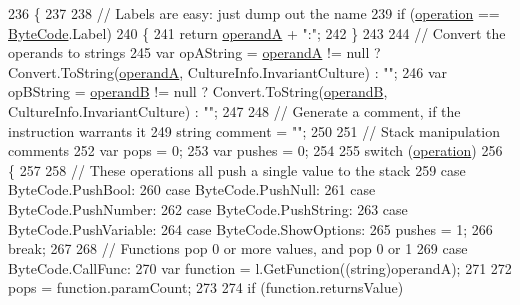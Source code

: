 \begin{DoxyCode}
236         \{
237 
238             \textcolor{comment}{// Labels are easy: just dump out the name}
239             \textcolor{keywordflow}{if} (\hyperlink{a00115_a566bf5f7198cc353ea5c3710cb3a31cb}{operation} == \hyperlink{a00050_ad5dfb6ee68ca7469623ad3e459f98894}{ByteCode}.Label)
240             \{
241                 \textcolor{keywordflow}{return} \hyperlink{a00115_ab5d386faa0d3dbc23db80f8e62706afd}{operandA} + \textcolor{stringliteral}{":"};
242             \}
243 
244             \textcolor{comment}{// Convert the operands to strings}
245             var opAString = \hyperlink{a00115_ab5d386faa0d3dbc23db80f8e62706afd}{operandA} != null ? Convert.ToString(\hyperlink{a00115_ab5d386faa0d3dbc23db80f8e62706afd}{operandA}, 
      CultureInfo.InvariantCulture) : \textcolor{stringliteral}{""};
246             var opBString = \hyperlink{a00115_a56348c6fe7eb919b7277afc06e5b224a}{operandB} != null ? Convert.ToString(\hyperlink{a00115_a56348c6fe7eb919b7277afc06e5b224a}{operandB}, 
      CultureInfo.InvariantCulture) : \textcolor{stringliteral}{""};
247 
248             \textcolor{comment}{// Generate a comment, if the instruction warrants it}
249             \textcolor{keywordtype}{string} comment = \textcolor{stringliteral}{""};
250 
251             \textcolor{comment}{// Stack manipulation comments}
252             var pops = 0;
253             var pushes = 0;
254 
255             \textcolor{keywordflow}{switch} (\hyperlink{a00115_a566bf5f7198cc353ea5c3710cb3a31cb}{operation})
256             \{
257 
258                 \textcolor{comment}{// These operations all push a single value to the stack}
259                 \textcolor{keywordflow}{case} ByteCode.PushBool:
260                 \textcolor{keywordflow}{case} ByteCode.PushNull:
261                 \textcolor{keywordflow}{case} ByteCode.PushNumber:
262                 \textcolor{keywordflow}{case} ByteCode.PushString:
263                 \textcolor{keywordflow}{case} ByteCode.PushVariable:
264                 \textcolor{keywordflow}{case} ByteCode.ShowOptions:
265                     pushes = 1;
266                     \textcolor{keywordflow}{break};
267 
268                 \textcolor{comment}{// Functions pop 0 or more values, and pop 0 or 1}
269                 \textcolor{keywordflow}{case} ByteCode.CallFunc:
270                     var \textcolor{keyword}{function} = l.GetFunction((string)operandA);
271 
272                     pops = function.paramCount;
273 
274                     \textcolor{keywordflow}{if} (\textcolor{keyword}{function}.returnsValue)

\end{DoxyCode}
